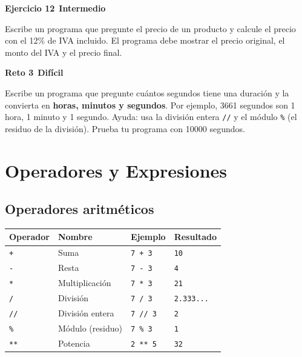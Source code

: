 \documentclass[11pt,a4paper]{article}
\newcommand{\intermedio}{\textcolor{naranjaVivo}{\faIcon{circle}\,\textbf{Intermedio}}}
\newcommand{\dificil}{\textcolor{rojoAlerta}{\faIcon{circle}\,\textbf{Difícil}}}
\begin{document}
\begin{cajaEjercicio}
\textbf{Ejercicio 12} \intermedio

Escribe un programa que pregunte el precio de un producto y calcule el precio con el 12\% de IVA incluido. El programa debe mostrar el precio original, el monto del IVA y el precio final.
\end{cajaEjercicio}

\begin{cajaReto}
\textbf{Reto 3} \dificil

Escribe un programa que pregunte cuántos segundos tiene una duración y la convierta en \textbf{horas, minutos y segundos}. Por ejemplo, 3661 segundos son 1 hora, 1 minuto y 1 segundo. Ayuda: usa la división entera \texttt{//} y el módulo \texttt{\%} (el residuo de la división). Prueba tu programa con 10000 segundos.
\end{cajaReto}

\section{Operadores y Expresiones}

\subsection{Operadores aritméticos}

\begin{table}[h]
\centering
\begin{tabularx}{\textwidth}{l l l X}
\toprule
\textbf{Operador} & \textbf{Nombre} & \textbf{Ejemplo} & \textbf{Resultado} \\
\midrule
\texttt{+} & Suma & \texttt{7 + 3} & \texttt{10} \\
\texttt{-} & Resta & \texttt{7 - 3} & \texttt{4} \\
\texttt{*} & Multiplicación & \texttt{7 * 3} & \texttt{21} \\
\texttt{/} & División & \texttt{7 / 3} & \texttt{2.333...} \\
\texttt{//} & División entera & \texttt{7 // 3} & \texttt{2} \\
\texttt{\%} & Módulo (residuo) & \texttt{7 \% 3} & \texttt{1} \\
\texttt{**} & Potencia & \texttt{2 ** 5} & \texttt{32} \\
\bottomrule
\end{tabularx}
\end{table}
\end{document}
